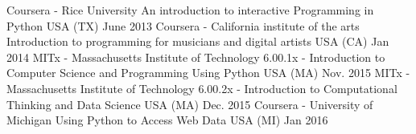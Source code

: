 \begin{cvhonors}
  \cvhonor
    {Coursera - Rice University }
    {An introduction to interactive Programming in Python}
    {USA (TX)}
    {June 2013}
  \cvhonor
    {Coursera - California institute of the arts}
    {Introduction to programming for musicians and digital artists}
    {USA (CA)}
    {Jan 2014}
  \cvhonor
    {MITx - Massachusetts Institute of Technology}
    {6.00.1x - Introduction to Computer Science and Programming Using Python}
    {USA (MA)}
    {Nov. 2015}
  \cvhonor
    {MITx - Massachusetts Institute of Technology}
    {6.00.2x - Introduction to Computational Thinking and Data Science}
    {USA (MA)}
    {Dec. 2015}
  \cvhonor
    {Coursera - University of Michigan}
    {Using Python to Access Web Data}
    {USA (MI)}
    {Jan 2016}
\end{cvhonors}
